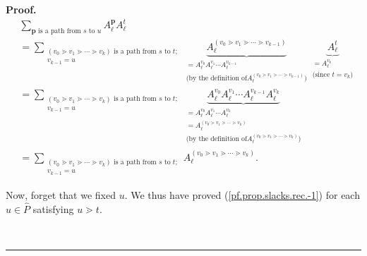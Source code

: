 \documentclass[numbers=enddot,12pt,final,onecolumn,notitlepage]{scrartcl}%
\theoremstyle{definition}
\newenvironment{verlong}{}{}
\newcommand{\downslack}{A}
\newenvironment{proof}[1][Proof]{\noindent\textbf{#1.} }{\ \rule{0.5em}{0.5em}}
\let\sumnonlimits\sum
\renewcommand{\sum}{\sumnonlimits\limits}
\begin{document}
\begin{verlong}
\begin{proof}
\begin{align}
&  \sum_{\mathbf{p}\text{ is a path from }s\text{ to }u}\downslack_{\ell
}^{\mathbf{p}}\downslack_{\ell}^{t}\nonumber\\
&  =\sum_{\substack{\left(  v_{0}\gtrdot v_{1}\gtrdot\cdots\gtrdot
v_{k}\right)  \text{ is a path from }s\text{ to }t;\\v_{k-1}=u}%
}\underbrace{\downslack_{\ell}^{\left(  v_{0}\gtrdot v_{1}\gtrdot\cdots\gtrdot
v_{k-1}\right)  }}_{\substack{=\downslack_{\ell}^{v_{0}}\downslack_{\ell
}^{v_{1}}\cdots\downslack_{\ell}^{v_{k-1}}\\\text{(by the definition of
}\downslack_{\ell}^{\left(  v_{0}\gtrdot v_{1}\gtrdot\cdots\gtrdot
v_{k-1}\right)  }\text{)}}}\underbrace{\downslack_{\ell}^{t}}%
_{\substack{=\downslack_{\ell}^{v_{k}}\\\text{(since }t=v_{k}\text{)}%
}}\nonumber\\
&  =\sum_{\substack{\left(  v_{0}\gtrdot v_{1}\gtrdot\cdots\gtrdot
v_{k}\right)  \text{ is a path from }s\text{ to }t;\\v_{k-1}=u}%
}\underbrace{\downslack_{\ell}^{v_{0}}\downslack_{\ell}^{v_{1}}\cdots
\downslack_{\ell}^{v_{k-1}}\downslack_{\ell}^{v_{k}}}%
_{\substack{=\downslack_{\ell}^{v_{0}}\downslack_{\ell}^{v_{1}}\cdots
\downslack_{\ell}^{v_{k}}\\=\downslack_{\ell}^{\left(  v_{0}\gtrdot
v_{1}\gtrdot\cdots\gtrdot v_{k}\right)  }\\\text{(by the definition of
}\downslack_{\ell}^{\left(  v_{0}\gtrdot v_{1}\gtrdot\cdots\gtrdot
v_{k}\right)  }\text{)}}}\nonumber\\
&  =\sum_{\substack{\left(  v_{0}\gtrdot v_{1}\gtrdot\cdots\gtrdot
v_{k}\right)  \text{ is a path from }s\text{ to }t;\\v_{k-1}=u}%
}\downslack_{\ell}^{\left(  v_{0}\gtrdot v_{1}\gtrdot\cdots\gtrdot
v_{k}\right)  }. \label{pf.prop.slacks.rec.-1}%
\end{align}


Now, forget that we fixed $u$. We thus have proved
(\ref{pf.prop.slacks.rec.-1}) for each $u\in\widehat{P}$ satisfying $u\gtrdot
t$.


\end{proof}
\end{verlong}
\end{document}
